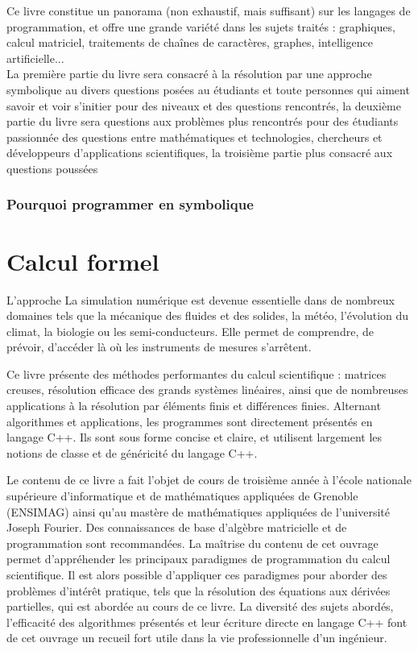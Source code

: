 \documentclass[11pt,fleqn]{book} %
\begin{document}
Ce livre constitue un panorama (non exhaustif, mais suffisant) sur les langages de programmation, et offre une grande variété dans les sujets traités : graphiques, calcul matriciel, traitements de chaînes de caractères, graphes, intelligence artificielle...
\\
La première partie du livre sera consacré \`a la résolution par une approche symbolique au divers questions posées au étudiants et toute personnes qui aiment savoir et voir s'initier  pour des niveaux et des questions rencontrés, la deuxième partie du livre sera questions aux problèmes plus rencontrés pour des étudiants passionnée des questions entre mathématiques et technologies, chercheurs et développeurs d'applications scientifiques, la troisième partie plus consacré aux questions poussées  


\subsection{Pourquoi programmer en symbolique }




\chapter{Calcul formel}

L'approche La simulation numérique est devenue essentielle dans de nombreux domaines tels que la mécanique des fluides et des solides, la météo, l'évolution du climat, la biologie ou les semi-conducteurs. Elle permet de comprendre, de prévoir, d'accéder là où les instruments de mesures s'arrêtent. 

Ce livre présente des méthodes performantes du calcul scientifique : matrices creuses, résolution efficace des grands systèmes linéaires, ainsi que de nombreuses applications à la résolution par éléments finis et différences finies. Alternant algorithmes et applications, les programmes sont directement présentés en langage C++. Ils sont sous forme concise et claire, et utilisent largement les notions de classe et de généricité du langage C++. 

Le contenu de ce livre a fait l'objet de cours de troisième année à l'école nationale supérieure d'informatique et de mathématiques appliquées de Grenoble (ENSIMAG) ainsi qu'au mastère de mathématiques appliquées de l'université Joseph Fourier. Des connaissances de base d'algèbre matricielle et de programmation sont recommandées. La maîtrise du contenu de cet ouvrage permet d'appréhender les principaux paradigmes de programmation du calcul scientifique. Il est alors possible d'appliquer ces paradigmes pour aborder des problèmes d'intérêt pratique, tels que la résolution des équations aux dérivées partielles, qui est abordée au cours de ce livre. La diversité des sujets abordés, l'efficacité des algorithmes présentés et leur écriture directe en langage C++ font de cet ouvrage un recueil fort utile dans la vie professionnelle d'un ingénieur. 
\end{document}
